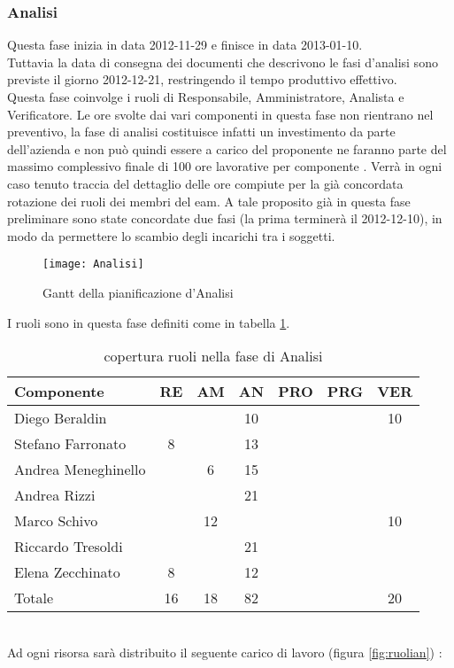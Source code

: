 \subsubsection{Analisi}
Questa fase inizia in data 2012-11-29 e finisce in data 2013-01-10.\\
Tuttavia la data di consegna dei documenti che descrivono le fasi d'analisi sono previste il giorno 2012-12-21, restringendo il tempo produttivo effettivo.\\
Questa fase coinvolge i ruoli di Responsabile, Amministratore, Analista e Verificatore.
Le ore svolte dai vari componenti in questa fase non rientrano nel preventivo, la fase di analisi costituisce infatti un investimento da parte dell’azienda e non può quindi essere a carico del proponente ne faranno parte del massimo complessivo finale di 100 ore lavorative per componente .
Verrà in ogni caso tenuto traccia del dettaglio delle ore compiute per la già concordata rotazione dei ruoli dei membri del eam. A tale proposito già in questa fase preliminare sono state concordate due fasi (la prima terminerà il 2012-12-10), in modo da permettere lo scambio degli incarichi tra i soggetti.
\begin{figure}[h!]
  \texttt{[image: Analisi]}
\caption{Gantt della pianificazione d'Analisi}
\end{figure}
\clearpage
I ruoli sono in questa fase definiti come in tabella \ref{tab:ruolian}.
\begin{table}[h!]
\centering
\begin{tabular}{|l|c|c|c|c|c|c|}
\hline
Componente& RE& AM& AN& PRO& PRG& VER\\
\hline
Diego Beraldin & & & 10& & & 10\\
Stefano Farronato & 8& & 13& & & \\
Andrea Meneghinello & & 6& 15& & & \\
Andrea Rizzi & & & 21& & & \\
Marco Schivo & & 12& & & & 10\\
Riccardo Tresoldi & & & 21& & & \\
Elena Zecchinato & 8& & 12& & & \\
\hline
Totale & 16& 18& 82& & & 20\\
\hline
\end{tabular}
\caption{copertura ruoli nella fase di Analisi}\label{tab:ruolian}
\end{table}\\
Ad ogni risorsa sarà distribuito il seguente carico di lavoro (figura \ref{fig:ruolian}) :\\
